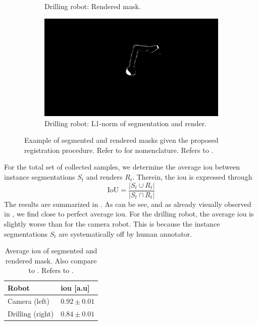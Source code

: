 \begin{figure}[tb]
\begin{subfigure}[b]{0.32\textwidth}
        \caption{Drilling robot: Rendered mask.}
    \end{subfigure}
    \begin{subfigure}[b]{0.32\textwidth}
        \includegraphics[width=\textwidth]{chapter_1/img/drill_left_difference_1.png}
        \caption{Drilling robot: L1-norm of segmentation and render.}
    \end{subfigure}
    \caption{Example of segmented and rendered masks given the proposed registration procedure. Refer to  for nomenclature. Refers to .}
    \label{c1:fig:masks}
\end{figure}

For the total set of collected samples, we determine the average \acrfull{iou} between instance segmentations $S_t$ and renders $R_t$. Therein, the \acrshort{iou} is expressed through
\begin{equation}
    \text{IoU} = \frac{|S_t \cup R_t|}{|S_t \cap R_t|}
\end{equation}
The results are summarized in . As can be see, and as already visually observed in , we find close to perfect average \acrshort{iou}. For the drilling robot, the average \acrshort{iou} is slightly worse than for the camera robot. This is because the instance segmentations $S_t$ are systematically off by human annotator.
\begin{table}[tb]
\centering
\caption{Average \acrshort{iou} of segmented and rendered mask. Also compare to . Refers to .}
\label{c1:tab:iou}
\begin{tabular}{@{}ll@{}}
\toprule
Robot         & \acrshort{iou} {[}a.u{]}   \\ \midrule
Camera (left)    & $0.92 \pm 0.01$ \\
Drilling (right) & $0.84 \pm 0.01$ \\ \bottomrule
\end{tabular}
\end{table}

